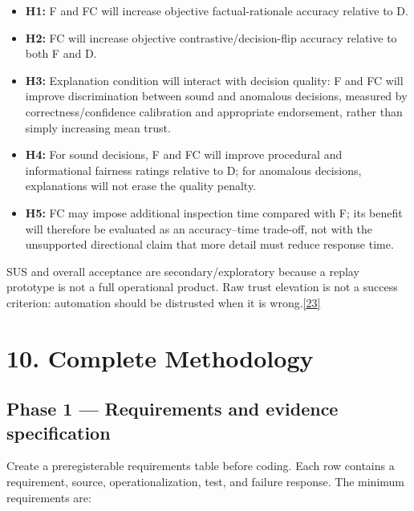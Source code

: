 \documentclass[
  english,
  11pt,
  a4paper,
]{article}
\providecommand{\tightlist}{%
  \setlength{\itemsep}{0pt}\setlength{\parskip}{0pt}}
\begin{document}
\begin{itemize}
\tightlist
\item
  \textbf{H1:} F and FC will increase objective factual-rationale
  accuracy relative to D.
\item
  \textbf{H2:} FC will increase objective contrastive/decision-flip
  accuracy relative to both F and D.
\item
  \textbf{H3:} Explanation condition will interact with decision
  quality: F and FC will improve discrimination between sound and
  anomalous decisions, measured by correctness/confidence calibration
  and appropriate endorsement, rather than simply increasing mean trust.
\item
  \textbf{H4:} For sound decisions, F and FC will improve procedural and
  informational fairness ratings relative to D; for anomalous decisions,
  explanations will not erase the quality penalty.
\item
  \textbf{H5:} FC may impose additional inspection time compared with F;
  its benefit will therefore be evaluated as an accuracy--time
  trade-off, not with the unsupported directional claim that more detail
  must reduce response time.
\end{itemize}

SUS and overall acceptance are secondary/exploratory because a replay
prototype is not a full operational product. Raw trust elevation is not
a success criterion: automation should be distrusted when it is
wrong.\hyperref[source-23]{[23]}

\section{10. Complete Methodology}\label{complete-methodology}

\subsection{Phase 1 --- Requirements and evidence
specification}\label{phase-1-requirements-and-evidence-specification}

Create a preregisterable requirements table before coding. Each row
contains a requirement, source, operationalization, test, and failure
response. The minimum requirements are:
\end{document}
